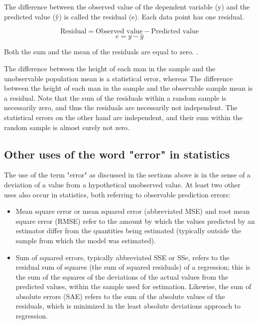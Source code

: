 \documentclass[Main.tex]{subfiles}
\begin{document}
The difference between the observed value of the dependent variable (y) and the predicted value (ŷ) is called the residual (e). Each data point has one residual.

\[ \mbox{Residual} = \mbox{Observed value} - \mbox{Predicted value}\]
\[e = y - \hat{y} \]

Both the sum and the mean of the residuals are equal to zero. .



The difference between the height of each man in the sample and the unobservable population mean is a statistical error, whereas
The difference between the height of each man in the sample and the observable sample mean is a residual.
Note that the sum of the residuals within a random sample is necessarily zero, and thus the residuals are necessarily not independent. The statistical errors on the other hand are independent, and their sum within the random sample is almost surely not zero.


\subsection{Other uses of the word "error" in statistics}

The use of the term "error" as discussed in the sections above is in the sense of a deviation of a value from a hypothetical unobserved value. At least two other uses also occur in statistics, both referring to observable prediction errors:

\begin{itemize}
	\item Mean square error or mean squared error (abbreviated MSE) and root mean square error (RMSE) refer to the amount by which the values predicted by an estimator differ from the quantities being estimated (typically outside the sample from which the model was estimated).
	
	\item 
	Sum of squared errors, typically abbreviated SSE or SSe, refers to the residual sum of squares (the sum of squared residuals) of a regression; this is the sum of the squares of the deviations of the actual values from the predicted values, within the sample used for estimation. Likewise, the sum of absolute errors (SAE) refers to the sum of the absolute values of the residuals, which is minimized in the least absolute deviations approach to regression.
	
\end{itemize}
\end{document}
